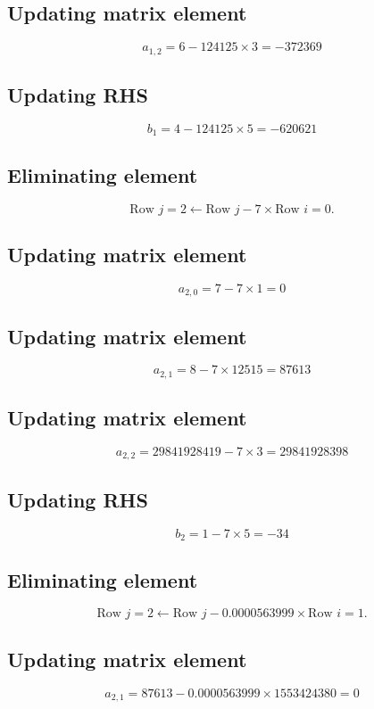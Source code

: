 \documentclass{article}
\begin{document}
\subsection*{ \vspace{1em} Updating matrix element}
\[
a_{1,2} = 6 - 124125 \times 3 = -372369
\]
\subsection*{ \vspace{1em} Updating RHS}
\[
b_{1} = 4 - 124125 \times 5 = -620621
\]
\subsection*{ \vspace{1em} Eliminating element}
\[
\text{Row } j = 2 \leftarrow \text{Row } j - 7 \times \text{Row } i = 0.
\]
\subsection*{ \vspace{1em} Updating matrix element}
\[
a_{2,0} = 7 - 7 \times 1 = 0
\]
\subsection*{ \vspace{1em} Updating matrix element}
\[
a_{2,1} = 8 - 7 \times 12515 = 87613
\]
\subsection*{ \vspace{1em} Updating matrix element}
\[
a_{2,2} = 29841928419 - 7 \times 3 = 29841928398
\]
\subsection*{ \vspace{1em} Updating RHS}
\[
b_{2} = 1 - 7 \times 5 = -34
\]
\subsection*{ \vspace{1em} Eliminating element}
\[
\text{Row } j = 2 \leftarrow \text{Row } j - 0.0000563999 \times \text{Row } i = 1.
\]
\subsection*{ \vspace{1em} Updating matrix element}
\[
a_{2,1} = 87613 - 0.0000563999 \times 1553424380 = 0
\]
\end{document}
